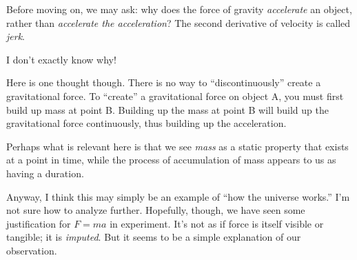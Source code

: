 Before moving on, we may ask: why does the force of gravity
\emph{accelerate} an object, rather than \emph{accelerate the
acceleration}? The second derivative of velocity is called \emph{jerk}.

I don't exactly know why!

Here is one thought though. There is no way to ``discontinuously''
create a gravitational force. To ``create'' a gravitational force on
object A, you must first build up mass at point B. Building up the mass
at point B will build up the gravitational force continuously, thus
building up the acceleration.

Perhaps what is relevant here is that we see \emph{mass} as a static
property that exists at a point in time, while the process of
accumulation of mass appears to us as having a duration.

Anyway, I think this may simply be an example of ``how the universe
works.'' I'm not sure how to analyze further. Hopefully, though, we have
seen some justification for $F = ma$ in experiment. It's not as if force
is itself visible or tangible; it is \emph{imputed}. But it seems to be
a simple explanation of our observation.
